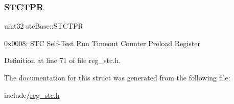\subsubsection{\texorpdfstring{S\+T\+C\+T\+PR}{STCTPR}}
{\footnotesize\ttfamily uint32 stc\+Base\+::\+S\+T\+C\+T\+PR}

0x0008\+: S\+TC Self-\/\+Test Run Timeout Counter Preload Register 

Definition at line 71 of file reg\+\_\+stc.\+h.



The documentation for this struct was generated from the following file\+:\begin{DoxyCompactItemize}
\item 
include/\mbox{\hyperlink{reg__stc_8h}{reg\+\_\+stc.\+h}}\end{DoxyCompactItemize}
